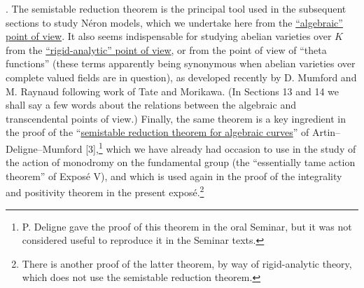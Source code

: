 . The semistable reduction theorem is the principal tool used in the
subsequent sections to study N\'eron models, which we undertake here
from the \underline{``algebraic'' point of view}. It also seems
indispensable for studying abelian varieties over $K$ from the
\underline{``rigid-analytic'' point of view}, or from the point of view
of ``theta functions'' (these terms apparently being synonymous when
abelian varieties over complete valued fields are in question), as
developed recently by D. Mumford and M. Raynaud following work of Tate
and Morikawa. (In Sections 13 and 14 we shall say a few words about the
relations between the algebraic and transcendental points of view.)
Finally, the same theorem is a key ingredient in the proof of the
``\underline{semistable reduction theorem for algebraic curves}'' of
Artin--Deligne--Mumford [3],\footnote{P. Deligne gave the proof of this
theorem in the oral Seminar, but it was not considered useful to
reproduce it in the Seminar texts.} which we have already had occasion
to use in the study of the action of monodromy on the fundamental group
(the ``essentially tame action theorem'' of Expos\'e V), and which is
used again in the proof of the integrality and positivity theorem 
in the present expos\'e.\footnote{There is another proof of the latter
theorem, by way of rigid-analytic theory, which does not use the
semistable reduction theorem.}

